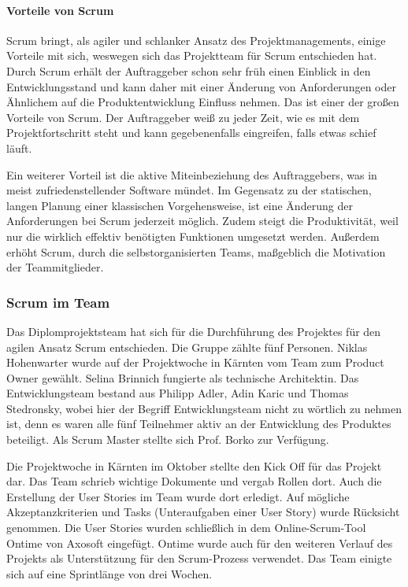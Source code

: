
\paragraph{Vorteile von Scrum}
Scrum bringt, als agiler und schlanker Ansatz des Projektmanagements, einige Vorteile mit sich, weswegen sich das Projektteam für Scrum entschieden hat. Durch Scrum erhält der Auftraggeber schon sehr früh einen Einblick in den Entwicklungsstand und kann daher mit einer Änderung von Anforderungen oder Ähnlichem auf die Produktentwicklung Einfluss nehmen. Das ist einer der großen Vorteile von Scrum. Der Auftraggeber weiß zu jeder Zeit, wie es mit dem Projektfortschritt steht und kann gegebenenfalls eingreifen, falls etwas schief läuft.\cite{SCRUM}

\newpage

Ein weiterer Vorteil ist die aktive Miteinbeziehung des Auftraggebers, was in meist zufriedenstellender Software mündet.
Im Gegensatz zu der statischen, langen Planung einer klassischen Vorgehensweise, ist eine Änderung der Anforderungen bei Scrum jederzeit möglich. Zudem steigt die Produktivität, weil nur die wirklich effektiv benötigten Funktionen umgesetzt werden. Außerdem erhöht Scrum, durch die selbstorganisierten Teams, maßgeblich die Motivation der Teammitglieder. \cite{SCRUM}

\subsubsection{Scrum im Team}
Das Diplomprojektsteam hat sich für die Durchführung des Projektes für den agilen Ansatz Scrum entschieden. Die Gruppe zählte fünf Personen. Niklas Hohenwarter wurde auf der Projektwoche in Kärnten vom Team zum Product Owner gewählt. Selina Brinnich fungierte als technische Architektin. Das Entwicklungsteam bestand aus Philipp Adler, Adin Karic und Thomas Stedronsky, wobei hier der Begriff Entwicklungsteam nicht zu wörtlich zu nehmen ist, denn es waren alle fünf Teilnehmer aktiv an der Entwicklung des Produktes beteiligt. Als Scrum Master stellte sich Prof. Borko zur Verfügung.

Die Projektwoche in Kärnten im Oktober stellte den Kick Off für das Projekt dar. Das Team schrieb wichtige Dokumente und vergab Rollen dort. Auch die Erstellung der User Stories im Team wurde dort erledigt. Auf mögliche Akzeptanzkriterien und Tasks (Unteraufgaben einer User Story) wurde Rücksicht genommen. Die User Stories wurden schließlich in dem Online-Scrum-Tool Ontime von Axosoft eingefügt. Ontime wurde auch für den weiteren Verlauf des Projekts als Unterstützung für den Scrum-Prozess verwendet. Das Team einigte sich auf eine Sprintlänge von drei Wochen.

